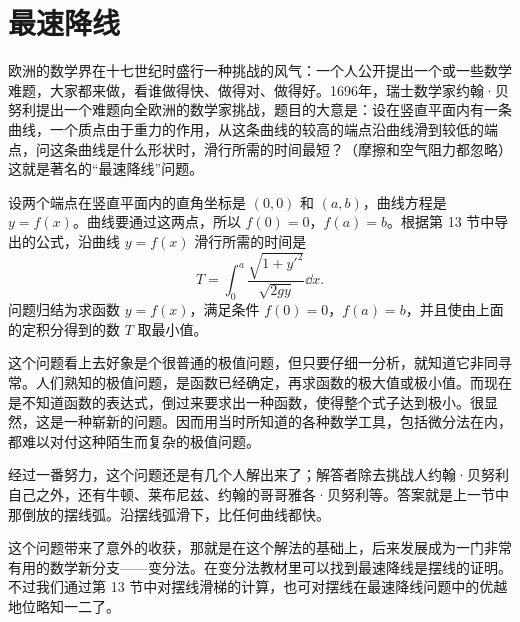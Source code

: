 \section{最速降线}

欧洲的数学界在十七世纪时盛行一种挑战的风气：一个人公开提出一个或一些数学难题，大家都来做，看谁做得快、做得对、做得好。1696年，瑞士数学家约翰·贝努利提出一个难题向全欧洲的数学家挑战，题目的大意是：设在竖直平面内有一条曲线，一个质点由于重力的作用，从这条曲线的较高的端点沿曲线滑到较低的端点，问这条曲线是什么形状时，滑行所需的时间最短？（摩擦和空气阻力都忽略）这就是著名的“最速降线”问题。

设两个端点在竖直平面内的直角坐标是 $(0, 0)$ 和 $(a, b)$，曲线方程是 $y = f(x)$。曲线要通过这两点，所以 $f(0) = 0$，$f(a) = b$。根据第 13 节中导出的公式，沿曲线 $y = f(x)$ 滑行所需的时间是
\[
  T = \int_{0}^{a} \frac{\sqrt{1 + y'^2}}{\sqrt{2gy}}\dd x.
\]
问题归结为求函数 $y = f(x)$，满足条件 $f(0) = 0$，$f(a) = b$，并且使由上面的定积分得到的数 $T$ 取最小值。

这个问题看上去好象是个很普通的极值问题，但只要仔细一分析，就知道它非同寻常。人们熟知的极值问题，是函数已经确定，再求函数的极大值或极小值。而现在是不知道函数的表达式，倒过来要求出一种函数，使得整个式子达到极小。很显然，这是一种崭新的问题。因而用当时所知道的各种数学工具，包括微分法在内，都难以对付这种陌生而复杂的极值问题。

经过一番努力，这个问题还是有几个人解出来了；解答者除去挑战人约翰·贝努利自己之外，还有牛顿、莱布尼兹、约翰的哥哥雅各·贝努利等。答案就是上一节中那倒放的摆线弧。沿摆线弧滑下，比任何曲线都快。

这个问题带来了意外的收获，那就是在这个解法的基础上，后来发展成为一门非常有用的数学新分支——变分法。在变分法教材里可以找到最速降线是摆线的证明。不过我们通过第 13 节中对摆线滑梯的计算，也可对摆线在最速降线问题中的优越地位略知一二了。

